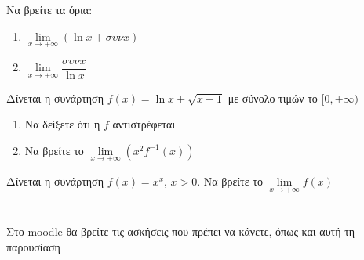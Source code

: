 \documentclass{presentation}
\begin{document}
\begin{askisi}
  Να βρείτε τα όρια:
  \begin{enumerate}
    \item $\lim\limits_{x \to +\infty}{\left( \ln x+συνx \right)}$ \pause
    \item $\lim\limits_{x \to +\infty}{ \dfrac{συνx}{\ln x} }$
  \end{enumerate}
\end{askisi}

\begin{askisi}
  Δίνεται η συνάρτηση $f(x)=\ln x + \sqrt{x-1}$ με σύνολο τιμών το $[0,+\infty)$
  \begin{enumerate}
    \item Να δείξετε ότι η $f$ αντιστρέφεται \pause
    \item Να βρείτε το $\lim\limits_{x \to +\infty}{ \left( x^2f^{-1}(x) \right)  }$
  \end{enumerate}
\end{askisi}

\begin{askisi}
  Δίνεται η συνάρτηση $f(x)=x^x$, $x>0$. Να βρείτε το $\lim\limits_{x \to +\infty}{ f(x)  }$
\end{askisi}

\section{}
\begin{frame}
  Στο moodle θα βρείτε τις ασκήσεις που πρέπει να κάνετε, όπως και αυτή τη παρουσίαση
\end{frame}
\end{document}
